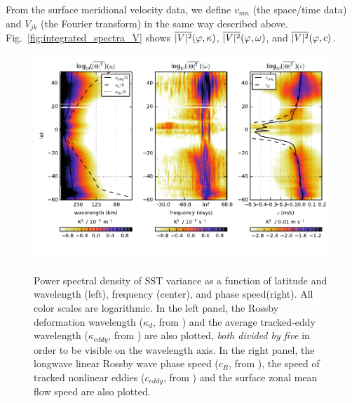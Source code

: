 \documentclass[10pt]{article}
\newcommand{\ol}{\ensuremath{\overline}}
\begin{document}
From the surface meridional velocity data, we define $v_{mn}$ (the space/time data) and $V_{jk}$ (the Fourier transform) in the same way described above. Fig.~\ref{fig:integrated_spectra_V} shows
$\ol{|V|^2}(\varphi, \kappa)$, $\ol{|V|^2}(\varphi, \omega)$, and $\ol{|V|^2}(\varphi, c)$. 

\begin{figure}[t]
  \noindent\includegraphics{../figures/SAT_50degwide/integrated_spectra_T.pdf}\\
  \caption{Power spectral density of SST variance as a function of latitude and wavelength (left), frequency (center), and phase speed(right). All color scales are logarithmic. In the left panel, the Rossby deformation wavelength ($\kappa_d$, from \citealt{TullochEtAl2011}) and the average tracked-eddy wavelength ($\kappa_{eddy}$, from \citealt{CheltonEtAl2011}) are also plotted, {\em both divided by five} in order to be visible on the wavelength axis. In the right panel, the longwave linear Rossby wave phase speed ($c_R$, from \citealt{TullochEtAl2011}), the speed of tracked nonlinear eddies ($c_{eddy}$, from \citealt{CheltonEtAl2011}) and the surface zonal mean flow speed are also plotted.}
  \label{fig:integrated_spectra_T}
\end{figure}
\end{document}

